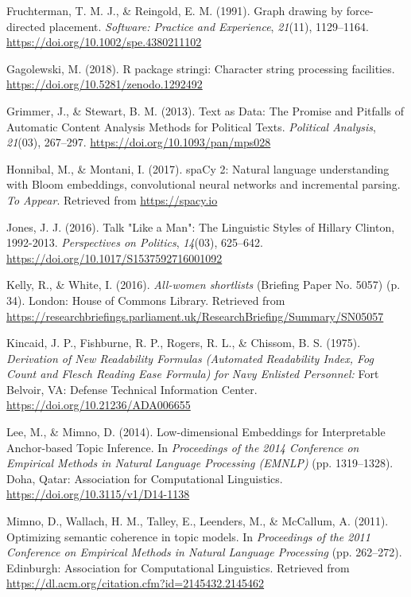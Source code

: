 \documentclass[]{article}
\theoremstyle{definition}
\theoremstyle{definition}
\theoremstyle{definition}
\theoremstyle{remark}
\begin{document}
\leavevmode\hypertarget{ref-fruchterman1991}{}%
Fruchterman, T. M. J., \& Reingold, E. M. (1991). Graph drawing by
force-directed placement. \emph{Software: Practice and Experience},
\emph{21}(11), 1129--1164. \url{https://doi.org/10.1002/spe.4380211102}

\leavevmode\hypertarget{ref-gagolewski2018}{}%
Gagolewski, M. (2018). R package stringi: Character string processing
facilities. \url{https://doi.org/10.5281/zenodo.1292492}

\leavevmode\hypertarget{ref-grimmer2013}{}%
Grimmer, J., \& Stewart, B. M. (2013). Text as Data: The Promise and
Pitfalls of Automatic Content Analysis Methods for Political Texts.
\emph{Political Analysis}, \emph{21}(03), 267--297.
\url{https://doi.org/10.1093/pan/mps028}

\leavevmode\hypertarget{ref-honnibal2017}{}%
Honnibal, M., \& Montani, I. (2017). spaCy 2: Natural language
understanding with Bloom embeddings, convolutional neural networks and
incremental parsing. \emph{To Appear}. Retrieved from
\url{https://spacy.io}

\leavevmode\hypertarget{ref-jones2016}{}%
Jones, J. J. (2016). Talk "Like a Man": The Linguistic Styles of Hillary
Clinton, 1992-2013. \emph{Perspectives on Politics}, \emph{14}(03),
625--642. \url{https://doi.org/10.1017/S1537592716001092}

\leavevmode\hypertarget{ref-kelly2016}{}%
Kelly, R., \& White, I. (2016). \emph{All-women shortlists} (Briefing
Paper No. 5057) (p. 34). London: House of Commons Library. Retrieved
from
\url{https://researchbriefings.parliament.uk/ResearchBriefing/Summary/SN05057}

\leavevmode\hypertarget{ref-kincaid1975}{}%
Kincaid, J. P., Fishburne, R. P., Rogers, R. L., \& Chissom, B. S.
(1975). \emph{Derivation of New Readability Formulas (Automated
Readability Index, Fog Count and Flesch Reading Ease Formula) for Navy
Enlisted Personnel:} Fort Belvoir, VA: Defense Technical Information
Center. \url{https://doi.org/10.21236/ADA006655}

\leavevmode\hypertarget{ref-lee2014c}{}%
Lee, M., \& Mimno, D. (2014). Low-dimensional Embeddings for
Interpretable Anchor-based Topic Inference. In \emph{Proceedings of the
2014 Conference on Empirical Methods in Natural Language Processing
(EMNLP)} (pp. 1319--1328). Doha, Qatar: Association for Computational
Linguistics. \url{https://doi.org/10.3115/v1/D14-1138}

\leavevmode\hypertarget{ref-mimno2011}{}%
Mimno, D., Wallach, H. M., Talley, E., Leenders, M., \& McCallum, A.
(2011). Optimizing semantic coherence in topic models. In
\emph{Proceedings of the 2011 Conference on Empirical Methods in Natural
Language Processing} (pp. 262--272). Edinburgh: Association for
Computational Linguistics. Retrieved from
\url{https://dl.acm.org/citation.cfm?id=2145432.2145462}
\end{document}
